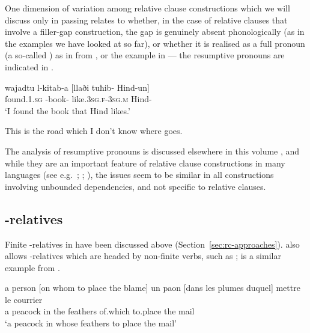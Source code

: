 \documentclass[output=paper,biblatex,babelshorthands,newtxmath,draftmode,colorlinks,citecolor=brown]{langscibook}
\begin{document}
One dimension of variation among relative clause
constructions which we will discuss only in passing relates to whether, in the case of
relative clauses that involve a filler-gap construction, the gap is genuinely absent
phonologically (as in the examples we have looked at so far), or whether it is realised as
a full pronoun (a so-called \emph{}) as in  from
, or the  example in  --- the
resumptive pronouns are indicated in \bolddescriptionintext.
\begin{exe}\ex\label{x:rc-50}
\gll wajadtu    l-kitab-a    [{llaði} tuħib-     Hind-un] \\
     found.\textsc{1.sg} {\DEF-book-\ACC} \hphantom{[}{that.\textsc{sg.m}}   like.\textsc{3sg.f-3sg.m} Hind-\NOM\\
\glt `I found the book that Hind likes.' 
\end{exe}
\begin{exe}\ex\label{x:rc-51}
  This is the road which I don't know where  goes.
\end{exe}
The analysis of resumptive pronouns is discussed elsewhere in this volume , and while they
are an important feature of relative clause constructions in many languages
(see e.g.\ \citealt{Vaillette2001a-u}; \citealt{Vaillette2001b}; \citealt{Taghvaipour:05,AbeilleGodard07,AB2013a-u}), the issues seem to be similar in all
constructions involving unbounded dependencies, and not specific to relative clauses.

\subsection{-relatives}
\label{sec:rc-wh-relatives}

Finite -relatives in  have been discussed above
(Section~\ref{sec:rc-approaches}).  also allows -relatives which are headed by
non-finite verbs, such as ;  is a similar example from .
\begin{exe}
\ex\label{x:rc-52}  a person [on whom to place the blame]
\ex\label{x:rc-53}
\gll un paon                 [dans les plumes duquel]  mettre le courrier\\
     a  peacock \hphantom{[}in the feathers of.which to.place the mail\\
     \glt `a  peacock in whose feathers to place the mail'
\end{exe}
\end{document}
